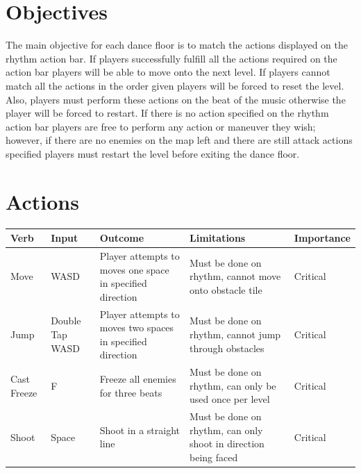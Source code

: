 \documentclass[]{article}
\begin{document}
\section*{Objectives}

The main objective for each dance floor is to match the actions
displayed on the rhythm action bar. If players successfully fulfill
all the actions required on the action bar players will be able to
move onto the next level. If players cannot match all the actions in
the order given players will be forced to reset the level. Also,
players must perform these actions on the beat of the music otherwise
the player will be forced to restart. If there is no action specified
on the rhythm action bar players are free to perform any action or
maneuver they wish; however, if there are no enemies on the map left
and there are still attack actions specified players must restart the
level before exiting the dance floor.


\section*{Actions}
\begin{table}[h]
\begin{tabular}{|l|L{2cm}|L{4cm}|L{4cm}|l|}
\hline
\textbf{Verb} & \textbf{Input} & \textbf{Outcome}  & \textbf{Limitations} & \textbf{Importance} \\
\hline
Move & WASD  & Player attempts to moves one space in specified direction 
 & Must be done on rhythm, cannot move onto obstacle tile & Critical   \\
\hline
Jump & Double Tap WASD & Player attempts to moves two spaces in specified direction 
 & Must be done on rhythm, cannot jump through obstacles & Critical   \\
\hline
Cast Freeze & F & Freeze all enemies for three beats   & Must be done on rhythm, can only be used once per level & Critical   \\
\hline
Shoot & Space & Shoot in a straight line & Must be done on rhythm, can only shoot in direction being faced & Critical  \\
\hline
\end{tabular}
\end{table}
\end{document}
